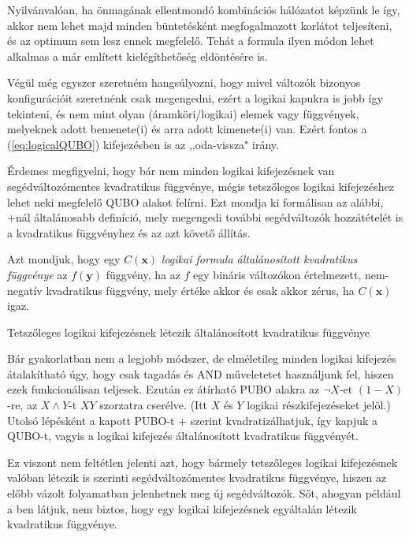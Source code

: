 Nyilvánvalóan, ha önmagának ellentmondó kombinációs hálózatot képzünk le így, akkor nem lehet majd minden büntetésként megfogalmazott korlátot teljesíteni, és az optimum sem lesz ennek megfelelő. Tehát a formula ilyen módon lehet alkalmas a már említett kielégíthetőség eldöntésére is.

Végül még egyszer szeretném hangsúlyozni, hogy mivel változók bizonyos konfigurációit szeretnénk csak megengedni, ezért a logikai kapukra is jobb így tekinteni, és nem mint olyan (áramköri/logikai) elemek vagy függvények, melyeknek adott bemenete(i) és arra adott kimenete(i) van. Ezért fontos a (\ref{eq:logicalQUBO}) kifejezésben is az ,,oda-vissza" irány.

Érdemes megfigyelni, hogy bár nem minden logikai kifejezésnek van segédváltozómentes kvadratikus függvénye, mégis tetszőleges logikai kifejezéshez lehet neki megfelelő QUBO alakot felírni. Ezt mondja ki formálisan az alábbi, \az+nál általánosabb definíció, mely megengedi további segédváltozók hozzátételét is a kvadratikus függvényhez és az azt követő állítás.

\begin{definition}\label{def:kvadFuncgen}
	Azt mondjuk, hogy egy $C(\mathbf{x})$ \textit{logikai formula általánosított kvadratikus függvénye} az $f(\mathbf{y})$ függvény, ha az $f$ egy bináris változókon értelmezett, nem-negatív kvadratikus függvény, mely értéke akkor és csak akkor zérus, ha $C(\mathbf{x})$ igaz.
\end{definition}



\begin{allitas}
	Tetszőleges logikai kifejezésnek létezik általánosított kvadratikus függvénye
	
	 Bár gyakorlatban nem a legjobb módszer, de elméletileg minden logikai kifejezés átalakítható úgy, hogy csak tagadás és AND műveletetet használjunk fel, hiszen ezek funkcionálisan teljesek. Ezután ez átírható PUBO alakra az $\neg X$-et $(1-X)$-re, az $X \wedge Y$-t $XY$ szorzatra cserélve. (Itt $X$ és $Y$ logikai részkifejezéseket jelöl.) Utolsó lépésként a kapott PUBO-t \az+ szerint kvadratizálhatjuk, így kapjuk a QUBO-t, vagyis a logikai kifejezés általánosított kvadratikus függvényét.
\end{allitas}

 Ez viszont nem feltétlen jelenti azt, hogy bármely tetszőleges logikai kifejezésnek valóban létezik is  szerinti segédváltozómentes kvadratikus függvénye, hiszen az előbb vázolt folyamatban jelenhetnek meg új segédváltozók. Sőt, ahogyan például a ben látjuk, nem biztos, hogy egy logikai kifejezésnek egyáltalán létezik kvadratikus függvénye.


